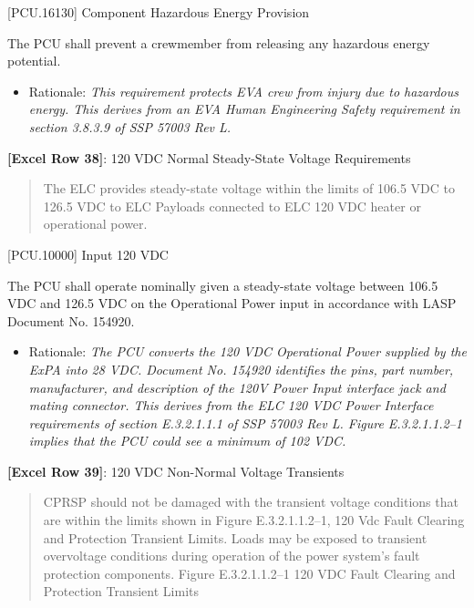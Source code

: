 [PCU.16130] Component Hazardous Energy Provision

The PCU shall prevent a crewmember from releasing any hazardous energy potential.

\begin{itemize}
\item{} Rationale: \emph{This requirement protects EVA crew from injury due to hazardous energy. This derives from an EVA Human Engineering Safety requirement in section 3.8.3.9 of SSP 57003 Rev L.}

\end{itemize}

\textbf{[Excel Row 38]}: 120 VDC Normal Steady-State Voltage Requirements

\begin{quote}
The ELC provides steady-state voltage within the limits of 106.5 VDC to 126.5 VDC to ELC Payloads connected to ELC 120 VDC heater or operational power.
\end{quote}

[PCU.10000] Input 120 VDC

The PCU shall operate nominally given a steady-state voltage between 106.5 VDC and 126.5 VDC on the Operational Power input in accordance with LASP Document No. 154920.

\begin{itemize}
\item{} Rationale: \emph{The PCU converts the 120 VDC Operational Power supplied by the ExPA into 28 VDC. Document No. 154920 identifies the pins, part number, manufacturer, and description of the 120V Power Input interface jack and mating connector. This derives from the ELC 120 VDC Power Interface requirements of section E.3.2.1.1.1 of SSP 57003 Rev L. Figure E.3.2.1.1.2--1 implies that the PCU could see a minimum of 102 VDC.}

\end{itemize}

\textbf{[Excel Row 39]}: 120 VDC Non-Normal Voltage Transients

\begin{quote}
CPRSP should not be damaged with the transient voltage conditions that are within the limits shown in Figure E.3.2.1.1.2--1, 120 Vdc Fault Clearing and Protection Transient Limits. Loads may be exposed to transient overvoltage conditions during operation of the power system’s fault protection components.
Figure E.3.2.1.1.2--1 120 VDC Fault Clearing and Protection Transient Limits
\end{quote}

